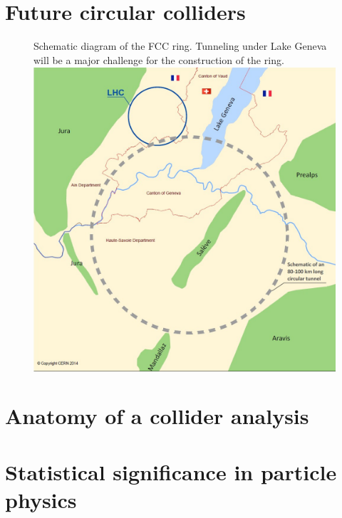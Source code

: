 \section{Future circular colliders}
\begin{figure}[h]
  \begin{sidecaption}
    {Schematic diagram of the FCC ring. Tunneling under Lake Geneva will be a major challenge for the construction of the ring.}
  \includegraphics[width=\textwidth]{images/FCC_ring_schematic}
  \end{sidecaption}
\end{figure}
\section{Anatomy of a collider analysis}
\section{Statistical significance in particle physics}

